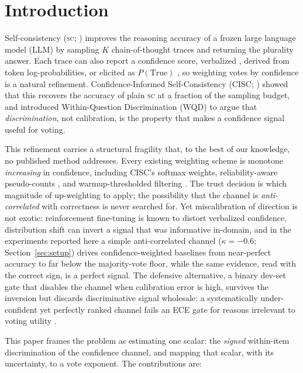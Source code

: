 \documentclass[twoside,11pt]{article}
\newcommand{\SC}{\textsc{sc}}
\begin{document}
\section{Introduction}

Self-consistency (\SC; \citealp{wang2023selfconsistency}) improves the reasoning accuracy of a frozen large language model (LLM) by sampling $K$ chain-of-thought traces and returning the plurality answer. Each trace can also report a confidence score, verbalized \citep{tian2023just,xiong2024can}, derived from token log-probabilities, or elicited as $P(\text{True})$ \citep{kadavath2022language}, so weighting votes by confidence is a natural refinement. Confidence-Informed Self-Consistency (CISC; \citealp{taubenfeld2025cisc}) showed that this recovers the accuracy of plain \SC{} at a fraction of the sampling budget, and introduced Within-Question Discrimination (WQD) to argue that \emph{discrimination}, not calibration, is the property that makes a confidence signal useful for voting.

This refinement carries a structural fragility that, to the best of our knowledge, no published method addresses. Every existing weighting scheme is monotone \emph{increasing} in confidence, including CISC's softmax weights, reliability-aware pseudo-counts \citep{reasc2026}, and warmup-thresholded filtering \citep{deepconf2025}. The trust decision is which magnitude of up-weighting to apply; the possibility that the channel is \emph{anti-correlated} with correctness is never searched for. Yet miscalibration of direction is not exotic: reinforcement fine-tuning is known to distort verbalized confidence, distribution shift can invert a signal that was informative in-domain, and in the experiments reported here a simple anti-correlated channel ($\kappa=-0.6$; Section~\ref{sec:setup}) drives confidence-weighted baselines from near-perfect accuracy to far below the majority-vote floor, while the same evidence, read with the correct sign, is a perfect signal. The defensive alternative, a binary dev-set gate that disables the channel when calibration error is high, survives the inversion but discards discriminative signal wholesale: a systematically under-confident yet perfectly ranked channel fails an ECE gate for reasons irrelevant to voting utility \citep{taubenfeld2025cisc,huang2024rankcalibration}.

This paper frames the problem as estimating one scalar: the \emph{signed} within-item discrimination of the confidence channel, and mapping that scalar, with its uncertainty, to a vote exponent. The contributions are:
\end{document}
